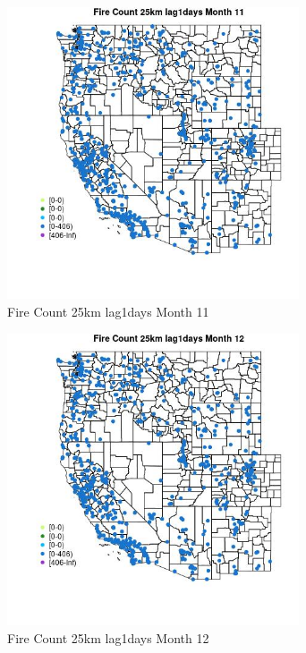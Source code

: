 \begin{figure} 
\centering  
\includegraphics[width=0.77\textwidth]{Code_Outputs/Report_ML_input_PM25_Step4_part_f_de_duplicated_aves_prioritize_24hr_obswNAs_MapObsMo11Fire_Count_25km_lag1days.jpg} 
\caption{\label{fig:Report_ML_input_PM25_Step4_part_f_de_duplicated_aves_prioritize_24hr_obswNAsMapObsMo11Fire_Count_25km_lag1days}Fire Count 25km lag1days Month 11} 
\end{figure} 
 

\begin{figure} 
\centering  
\includegraphics[width=0.77\textwidth]{Code_Outputs/Report_ML_input_PM25_Step4_part_f_de_duplicated_aves_prioritize_24hr_obswNAs_MapObsMo12Fire_Count_25km_lag1days.jpg} 
\caption{\label{fig:Report_ML_input_PM25_Step4_part_f_de_duplicated_aves_prioritize_24hr_obswNAsMapObsMo12Fire_Count_25km_lag1days}Fire Count 25km lag1days Month 12} 
\end{figure} 
 

